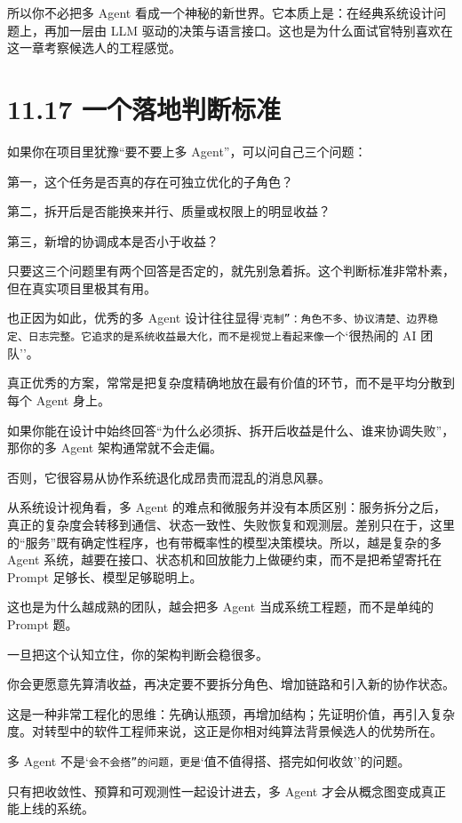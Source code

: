 所以你不必把多 Agent 看成一个神秘的新世界。它本质上是：在经典系统设计问题上，再加一层由 LLM 驱动的决策与语言接口。这也是为什么面试官特别喜欢在这一章考察候选人的工程感觉。


\section{11.17 一个落地判断标准}

如果你在项目里犹豫``要不要上多 Agent''，可以问自己三个问题：

第一，这个任务是否真的存在可独立优化的子角色？

第二，拆开后是否能换来并行、质量或权限上的明显收益？

第三，新增的协调成本是否小于收益？


只要这三个问题里有两个回答是否定的，就先别急着拆。这个判断标准非常朴素，但在真实项目里极其有用。


也正因为如此，优秀的多 Agent 设计往往显得`\texttt{克制''：角色不多、协议清楚、边界稳定、日志完整。它追求的是系统收益最大化，而不是视觉上看起来像一个}`很热闹的 AI 团队''。

真正优秀的方案，常常是把复杂度精确地放在最有价值的环节，而不是平均分散到每个 Agent 身上。

如果你能在设计中始终回答``为什么必须拆、拆开后收益是什么、谁来协调失败''，那你的多 Agent 架构通常就不会走偏。

否则，它很容易从协作系统退化成昂贵而混乱的消息风暴。

从系统设计视角看，多 Agent 的难点和微服务并没有本质区别：服务拆分之后，真正的复杂度会转移到通信、状态一致性、失败恢复和观测层。差别只在于，这里的``服务''既有确定性程序，也有带概率性的模型决策模块。所以，越是复杂的多 Agent 系统，越要在接口、状态机和回放能力上做硬约束，而不是把希望寄托在 Prompt 足够长、模型足够聪明上。

这也是为什么越成熟的团队，越会把多 Agent 当成系统工程题，而不是单纯的 Prompt 题。

一旦把这个认知立住，你的架构判断会稳很多。

你会更愿意先算清收益，再决定要不要拆分角色、增加链路和引入新的协作状态。

这是一种非常工程化的思维：先确认瓶颈，再增加结构；先证明价值，再引入复杂度。对转型中的软件工程师来说，这正是你相对纯算法背景候选人的优势所在。

多 Agent 不是`\texttt{会不会搭''的问题，更是}`值不值得搭、搭完如何收敛''的问题。

只有把收敛性、预算和可观测性一起设计进去，多 Agent 才会从概念图变成真正能上线的系统。


